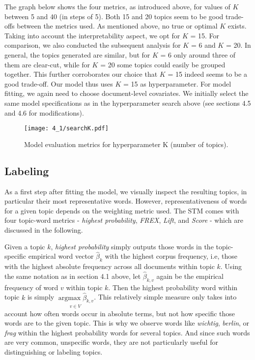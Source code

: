 \documentclass[12pt]{article}
\begin{document}
The graph below shows the four metrics, as introduced above, for values of $K$ between 5 and 40 (in steps of 5). Both 15 and 20 topics seem to be good trade-offs between the metrics used. As mentioned above, no true or optimal $K$ exists. Taking into account the interpretability aspect, we opt for $K$ = 15. For comparison, we also conducted the subsequent analysis for $K$ = 6 and $K$ = 20. In general, the topics generated are similar, but for $K$ = 6 only around three of them are clear-cut, while for $K$ = 20 some topics could easily be grouped together. This further corroborates our choice that $K$ = 15 indeed seems to be a good trade-off. Our model thus uses $K$ = 15 as hyperparameter. For model fitting, we again need to choose document-level covariates. We initially select the same model specifications as in the hyperparameter search above (see sections 4.5 and 4.6 for modifications).

\begin{figure}[h!]
  \centering
  \captionsetup{justification=centering,margin=2cm}
  \texttt{[image: 4\_1/searchK.pdf]}
  \caption{Model evaluation metrics for hyperparameter K (number of topics).}
  \label{fig:searchK}
\end{figure}

\subsection{Labeling}

As a first step after fitting the model, we visually inspect the resulting topics, in particular their most representative words. However, representativeness of words for a given topic depends on the weighting metric used. The STM comes with four topic-word metrics - \textit{highest probability}, \textit{FREX}, \textit{Lift}, and \textit{Score} - which are discussed in the following.

Given a topic $k$, \textit{highest probability} simply outputs those words in the topic-specific empirical word vector $\hat{\beta}_{k}$ with the highest corpus frequency, i.e, those with the highest absolute frequency across all documents within topic $k$. Using the same notation as in section 4.1 above, let $\hat{\beta}_{k,v}$ again be the empirical frequency of word $v$ within topic $k$. Then the highest probability word within topic $k$ is simply $\underset{v \in V}{\operatorname{argmax}\hat{\beta}_{k,v}}$. This relatively simple measure only takes into account how often words occur in absolute terms, but not how specific those words are to the given topic. This is why we observe words like \textit{wichtig}, \textit{berlin}, or \textit{frag} within the highest probability words for several topics. And since such words are very common, unspecific words, they are not particularly useful for distinguishing or labeling topics.
\end{document}
